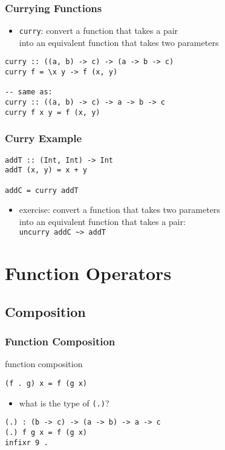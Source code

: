 \documentclass[dvipsnames]{beamer}
\theoremstyle{plain}
\begin{document}
\begin{frame}[fragile]
  \frametitle{Currying Functions}

  \begin{itemize}
    \item \lstinline|curry|: convert a function that takes a pair\\
      into an equivalent function that takes two parameters
  \end{itemize}

  \begin{lstlisting}[deletekeywords={curry}]
curry :: ((a, b) -> c) -> (a -> b -> c)
curry f = \x y -> f (x, y)

-- same as:
curry :: ((a, b) -> c) -> a -> b -> c
curry f x y = f (x, y)
  \end{lstlisting}
\end{frame}

\begin{frame}[fragile]
  \frametitle{Curry Example}

  \begin{lstlisting}
addT :: (Int, Int) -> Int
addT (x, y) = x + y

addC = curry addT
  \end{lstlisting}

  \pause
  \begin{itemize}
    \item exercise: convert a function that takes two parameters\\
      into an equivalent function that takes a pair:\\
      \lstinline|uncurry addC ~> addT|
  \end{itemize}
\end{frame}

\section{Function Operators}

\subsection{Composition}

\begin{frame}[fragile]
  \frametitle{Function Composition}

  \begin{block}{function composition}
    \begin{lstlisting}
(f . g) x = f (g x)
    \end{lstlisting}
  \end{block}

  \pause
  \begin{itemize}
    \item what is the type of \lstinline|(.)|?
  \end{itemize}

  \begin{exampleblock}{}
    \begin{lstlisting}
(.) : (b -> c) -> (a -> b) -> a -> c
(.) f g x = f (g x)
infixr 9 .
    \end{lstlisting}
  \end{exampleblock}
\end{frame}
\end{document}

